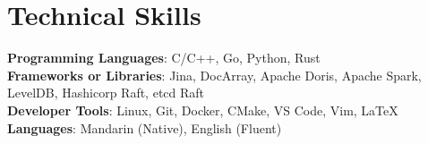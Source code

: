\documentclass[letterpaper,11pt]{article}
\begin{document}
%
\section{Technical Skills}
 \begin{itemize}[leftmargin=0.15in, label={}]
    \small{\item{
     \textbf{Programming Languages}{: C/C++, Go, Python, Rust} \\
     \textbf{Frameworks or Libraries}{: Jina, DocArray, Apache Doris, Apache Spark, LevelDB, Hashicorp Raft, etcd Raft} \\
     \textbf{Developer Tools}{: Linux, Git, Docker, CMake, VS Code, Vim, LaTeX} \\
     \textbf{Languages}{: Mandarin (Native), English (Fluent)}
    }}
 \end{itemize}


\end{document}
